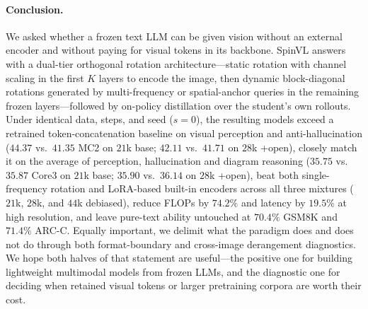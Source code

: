 \documentclass[10pt,twocolumn,letterpaper]{article}
\newcommand{\modelname}{SpinVL}
\begin{document}
\paragraph{Conclusion.}
We asked whether a frozen text LLM can be given vision without an external
encoder and without paying for visual tokens in its backbone. \modelname{}
answers with a dual-tier orthogonal rotation architecture---static rotation
with channel scaling in the first $K$ layers to encode the image, then dynamic
block-diagonal rotations generated by multi-frequency or spatial-anchor
queries in the remaining frozen layers---followed by on-policy distillation
over the student's own rollouts. Under identical data, steps, and seed
($s{=}0$), the resulting models exceed a retrained token-concatenation baseline
on visual perception and anti-hallucination ($44.37$ vs.\ $41.35$ MC2 on $21$k
base; $42.11$ vs.\ $41.71$ on $28$k +open), closely match it on the average of
perception, hallucination and diagram reasoning ($35.75$ vs.\ $35.87$ Core3 on
$21$k base; $35.90$ vs.\ $36.14$ on $28$k +open), beat both single-frequency
rotation and LoRA-based built-in encoders across all three mixtures ($21$k,
$28$k, and $44$k debiased), reduce FLOPs by $74.2\%$ and latency by $19.5\%$ at
high resolution, and leave pure-text ability untouched at $70.4\%$ GSM8K and
$71.4\%$ ARC-C. Equally important, we delimit what the paradigm does and does
not do through both format-boundary and cross-image derangement diagnostics. We
hope both halves of that statement are useful---the positive one for building
lightweight multimodal models from frozen LLMs, and the diagnostic one for
deciding when retained visual tokens or larger pretraining corpora are worth
their cost.

{\small


}
\end{document}

